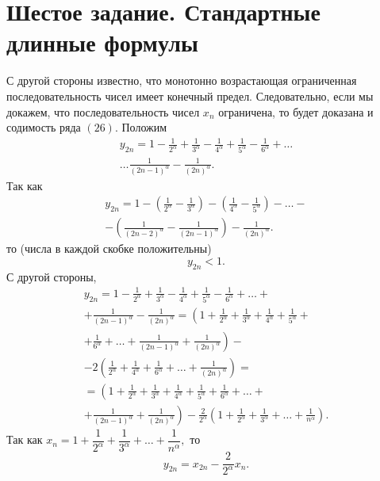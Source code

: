 \documentclass[a4paper,12pt]{article} %
\begin{document}
	\section{Шестое задание. Стандартные длинные формулы}
	С другой стороны известно, что монотонно возрастающая ограниченная последовательность чисел имеет конечный предел. Следовательно, если мы докажем, что последовательность чисел $x_n$ ограничена, то будет доказана и содимость ряда $\left( 26 \right)$. Положим
	\begin{multline*}
		y_{2n} = 1 - 
		\frac{1}{2^ \alpha} + 
		\frac{1}{3^ \alpha} -
		\frac{1}{4^ \alpha} +
		\frac{1}{5^ \alpha} -
		\frac{1}{6^ \alpha} + 
		\dots \\
		\dots 
		\frac{1}{ \left(2n - 1 \right)^ \alpha} -
		\frac{1}{ \left(2n \right)^ \alpha}.
	\end{multline*}
	Так как
	\begin{multline*}
		y_{2n} = 1 - 
		\left( 
			\frac{1}{2^ \alpha} - 
			\frac{1}{3^ \alpha}
		\right) -
		\left(
			\frac{1}{4^ \alpha} -
			\frac{1}{5^ \alpha} 
		\right) - 
		\dots - \\
		- \left(
			\frac{1}{ \left(2n - 2 \right)^ \alpha} -
			\frac{1}{ \left(2n - 1 \right)^ \alpha} 
		\right) -
		\frac{1}{ \left(2n \right)^ \alpha}.
	\end{multline*}
	то (числа в каждой скобке положительны)
	$$y_{2n} < 1.$$
	С другой стороны,
	\begin{multline*}
		y_{2n} = 1 - 
		\frac{1}{2^ \alpha} + 
		\frac{1}{3^ \alpha} -
		\frac{1}{4^ \alpha} +
		\frac{1}{5^ \alpha} -
		\frac{1}{6^ \alpha} + 
		\dots + \\
		+ \frac{1}{ \left(2n - 1 \right)^ \alpha} -
		\frac{1}{ \left(2n \right)^ \alpha} =
		\left(
			1 + 
			\frac{1}{2^ \alpha} + 
			\frac{1}{3^ \alpha} +
			\frac{1}{4^ \alpha} +
			\frac{1}{5^ \alpha} +
		\right. \\
		\left.
			+ \frac{1}{6^ \alpha} +
			\dots +
			\frac{1}{ \left(2n - 1 \right)^ \alpha} +
			\frac{1}{ \left(2n \right)^ \alpha}
		\right) - \\
		- 2
		\left(
			\frac{1}{2^ \alpha} + 
			\frac{1}{4^ \alpha} +
			\frac{1}{6^ \alpha} +
			\dots +
			\frac{1}{ \left(2n \right)^ \alpha}
		\right) = \\
		= \left(
			1 + 
			\frac{1}{2^ \alpha} + 
			\frac{1}{3^ \alpha} +
			\frac{1}{4^ \alpha} +
			\frac{1}{5^ \alpha} +
			\frac{1}{6^ \alpha} +
			\dots + 
		\right. \\
		\left.
			+ \frac{1}{ \left(2n - 1 \right)^ \alpha} +
			\frac{1}{ \left(2n \right)^ \alpha}
		\right)
		- \frac{2}{2^ \alpha}
		\left(
		1 +
		\frac{1}{2^ \alpha} + 
		\frac{1}{3^ \alpha} +
		\dots +
		\frac{1}{n^ \alpha}
		\right).
	\end{multline*}
	Так как 
	$x_n = 1 + 
	\dfrac{1}{2^ \alpha} + 
	\dfrac{1}{3^ \alpha} +
	\dots +
	\dfrac{1}{n^ \alpha},$
	то 
	$$y_{2n} = x_{2n} - \dfrac{2}{2^ \alpha} x_n.$$
	
\end{document}

